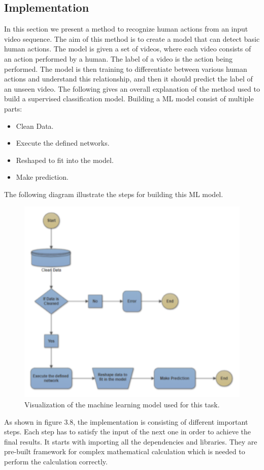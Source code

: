 \subsection{Implementation}
\hspace{5mm} In this section we present a method to recognize human actions from an input video sequence. The aim of this method is to create a model that can detect basic human actions. The model is given a set of videos, where each video consists of an action performed by a human. The label of a video is the action being performed. The model is then training to differentiate between various human actions and understand this relationship, and then it should predict the label of an unseen video. The following gives an overall explanation of the method used to build a supervised classification model. Building a ML model consist of multiple parts:
\begin{itemize}
\item Clean Data.
\item Execute the defined networks.
\item Reshaped to fit into the model. 
\item Make prediction.
\end{itemize}

The following diagram illustrate the steps for building this ML model.\\
\begin{figure}[ht]
\centering
\includegraphics{Figures/m}
\decoRule
\caption[Visualization of the machine learning model used for this task.]{Visualization of the machine learning model used for this task.}
\label{fig:la}
\end{figure}
\newpage
As shown in figure 3.8, the implementation is consisting of different important steps. Each step has to satisfy the input of the next one in order to achieve the final results. It starts with importing all the dependencies and libraries. They are pre-built framework for complex mathematical calculation which is needed to perform the calculation correctly.\\

